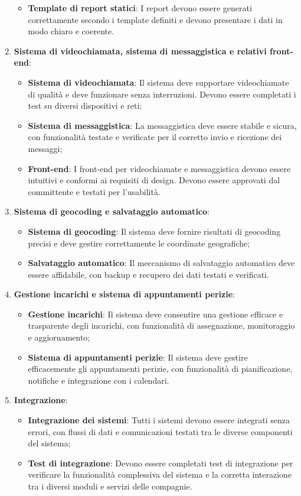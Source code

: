 \documentclass[a4paper,12pt, openright]{report}
\begin{document}
\begin{enumerate}
\begin{itemize}
        \item \textbf{Template di report statici}: I report devono essere generati correttamente secondo i template definiti e devono presentare i dati in modo chiaro e coerente.
    \end{itemize}
    \item \textbf{Sistema di videochiamata, sistema di messaggistica e relativi front-end}:
    \begin{itemize}
        \item \textbf{Sistema di videochiamata}: Il sistema deve supportare videochiamate di qualità e deve funzionare senza interruzioni. Devono essere completati i test su diversi dispositivi e reti;
        \item \textbf{Sistema di messaggistica}: La messaggistica deve essere stabile e sicura, con funzionalità testate e verificate per il corretto invio e ricezione dei messaggi;
        \item \textbf{Front-end}: I front-end per videochiamate e messaggistica devono essere intuitivi e conformi ai requisiti di design. Devono essere approvati dal committente e testati per l'usabilità.
    \end{itemize}
    \item \textbf{Sistema di geocoding e salvataggio automatico}:
    \begin{itemize}
        \item \textbf{Sistema di geocoding}: Il sistema deve fornire risultati di geocoding precisi e deve gestire correttamente le coordinate geografiche;
        \item \textbf{Salvataggio automatico}: Il meccanismo di salvataggio automatico deve essere affidabile, con backup e recupero dei dati testati e verificati.
    \end{itemize}
    \item \textbf{Gestione incarichi e sistema di appuntamenti perizie}:
    \begin{itemize}
        \item \textbf{Gestione incarichi}: Il sistema deve consentire una gestione efficace e trasparente degli incarichi, con funzionalità di assegnazione, monitoraggio e aggiornamento;
        \item \textbf{Sistema di appuntamenti perizie}: Il sistema deve gestire efficacemente gli appuntamenti perizie, con funzionalità di pianificazione, notifiche e integrazione con i calendari.
    \end{itemize}
    \item \textbf{Integrazione}:
    \begin{itemize}
        \item \textbf{Integrazione dei sistemi}: Tutti i sistemi devono essere integrati senza errori, con flussi di dati e comunicazioni testati tra le diverse componenti del sistema;
        \item \textbf{Test di integrazione}: Devono essere completati test di integrazione per verificare la funzionalità complessiva del sistema e la corretta interazione tra i diversi moduli e servizi delle compagnie.
    \end{itemize}
\end{enumerate}
\end{document}
